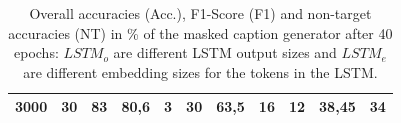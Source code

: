 \begin{table}[ht]
\begin{tabular}{cc|ccc|ccc|ccc}
        {3000}   & {30}     & {83}                                & {80,6}                              & {3}                                      & {30}          & {63,5}         & {16}        & {12}          & {38,45}        & {34}        \\
        \bottomrule
    \end{tabular}
    \caption{Overall accuracies (Acc.), F1-Score (F1) and non-target accuracies (NT) in \% of the masked caption generator after 40 epochs: $LSTM_o$ are different LSTM output sizes and $LSTM_e$ are different embedding sizes for the tokens in the LSTM.}
    \label{tab:results:masked-re-generator}
\end{table}

